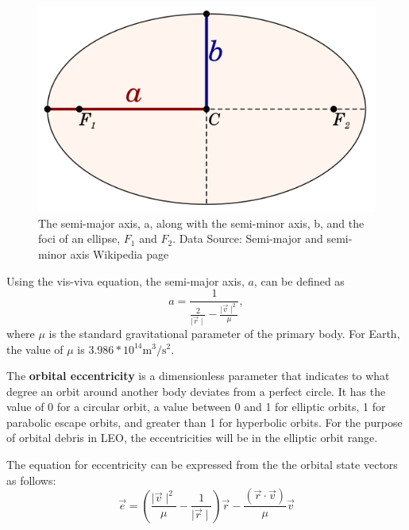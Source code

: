 \documentclass[a4paper, 12pt]{article}
\newcommand{\boldindex}[1]{%
	\textbf{#1}\index{#1}%
}
\begin{document}
\begin{figure}[h]
	\centering
	\includegraphics[scale=0.35]{semi-major_and_minor_axes}
	\caption{The semi-major axis, a, along with the semi-minor axis, b, and the foci of an ellipse, $F_1$ and $F_2$. Data Source: Semi-major and semi-minor axis Wikipedia page}
\end{figure}

Using the vis-viva equation, the semi-major axis, $a$, can be defined as
\begin{equation}
a = \frac{1}{\frac{2}{\mid \vec{r} \mid} - \frac{\mid \vec{v} \mid^2 }{\mu}},
\end{equation}
\noindent where $\mu$ is the standard gravitational parameter of the primary body. For Earth, the value of $\mu$ is $3.986 *10^{14}\text{m}^3/\text{s}^2$.

The \boldindex{orbital eccentricity} is a dimensionless parameter that indicates to what degree an orbit around another body deviates from a perfect circle. It has the value of 0 for a circular orbit, a value between 0 and 1 for elliptic orbits, 1 for parabolic escape orbits, and greater than 1 for hyperbolic orbits. For the purpose of orbital debris in LEO, the eccentricities will be in the elliptic orbit range.

The equation for eccentricity can be expressed from the the orbital state vectors as follows:
\begin{equation}
\vec{e} = \left(\frac{\mid \vec{v} \mid^2}{\mu} - \frac{1}{\mid \vec{r} \mid}\right)\vec{r} - \frac{(\vec{r} \cdot \vec{v})}{\mu}\vec{v}
\end{equation}
\end{document}
